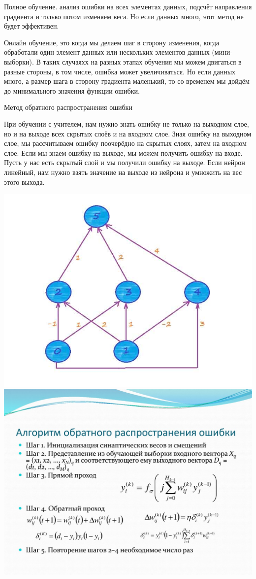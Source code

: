 \documentclass[12pt,a4paper]{report}
\begin{document}
Полное обучение. анализ ошибки на всех элементах данных, подсчёт направления градиента и только потом изменяем веса. Но если данных много, этот метод не будет эффективен.  

Онлайн обучение, это когда мы делаем шаг в сторону изменения, когда обработали один элемент данных или нескольких элементов данных (мини-выборки). В таких случаяхх на разных этапах обучения мы можем двигаться в разные стороны, в том числе, ошибка может увеличиваться. Но если данных много, а размер шага в сторону градиента маленький, то со временем мы дойдём до минимального значения функции ошибки. 

 Метод обратного распространения ошибки 

При обучении с учителем, нам нужно знать ошибку не только на выходном слое, но и на выходе всех скрытых слоёв и на входном слое. Зная ошибку на выходном слое, мы рассчитываем ошибку поочерёдно на скрытых слоях, затем на входном слое. Если мы знаем ошибку на выходе, мы можем получить ошибку на входе. Пусть у нас есть скрытый слой и мы получили ошибку на выходе. Если нейрон линейный, нам нужно взять значение на выходе из нейрона и умножить на вес этого выхода.  

\includegraphics{weight}
\includegraphics{weight2}
\end{document}
